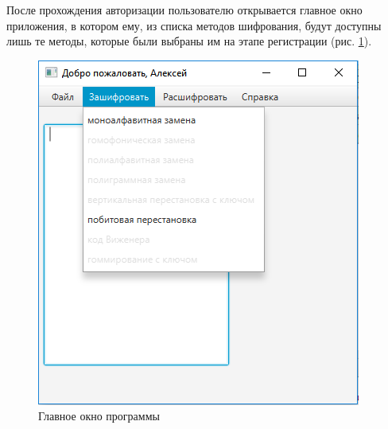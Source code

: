 \documentclass[a4paper,12pt]{article}
\begin{document}
\par После прохождения авторизации пользователю открывается главное окно приложения, в котором ему, из списка методов шифрования, будут доступны лишь те методы, которые были выбраны им на этапе регистрации (рис. \ref{fig:main_form}).
\begin{center}
	\begin{figure}[h!]
		\centering
   		\includegraphics[scale=0.5]{img/main_form.png}
   		\caption{Главное окно программы}
   		\label{fig:main_form}
    \end{figure}
\end{center}
\end{document}
